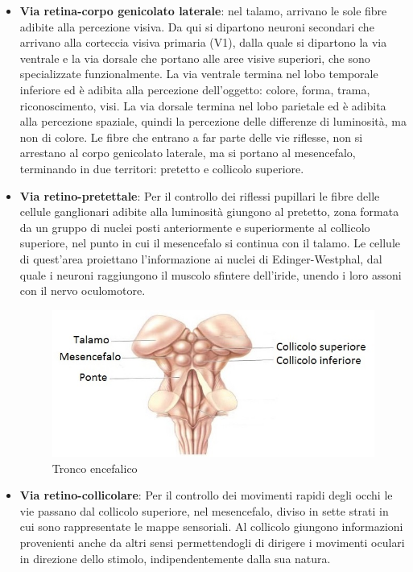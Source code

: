 \begin{itemize}
\item \textbf{Via retina-corpo genicolato laterale}: nel talamo, arrivano le sole fibre adibite alla percezione visiva. Da qui si dipartono neuroni secondari che arrivano alla corteccia visiva primaria (V1), dalla quale si dipartono la via ventrale e la via dorsale che portano alle aree visive superiori, che sono specializzate funzionalmente. La via ventrale termina nel lobo temporale inferiore ed è adibita alla percezione dell’oggetto: colore, forma, trama, riconoscimento, visi. La via dorsale termina nel lobo parietale ed è adibita alla percezione spaziale, quindi la percezione delle differenze di luminosità, ma non di colore.
Le fibre che entrano a far parte delle vie riflesse, non si arrestano al corpo genicolato laterale, ma si portano al mesencefalo, terminando in due territori: pretetto e collicolo superiore.
\item \textbf{Via retino-pretettale}: Per il controllo dei riflessi pupillari le fibre delle cellule ganglionari adibite alla luminosità giungono al pretetto, zona formata da un gruppo di nuclei posti anteriormente e superiormente al collicolo superiore, nel punto in cui il mesencefalo si continua con il talamo. Le cellule di quest’area proiettano l’informazione ai nuclei di Edinger-Westphal, dal quale i neuroni raggiungono il muscolo sfintere dell’iride, unendo i loro assoni con il nervo oculomotore.

\begin{figure}[h!]
	\centering
	\includegraphics[scale=0.52]{source/immagini/tronco_encefalico.jpg}
	\caption[Semantic Web stack]{Tronco encefalico}
	\label{fig:issuexample}
\end{figure}

\item \textbf{Via retino-collicolare}: Per il controllo dei movimenti rapidi degli occhi le vie passano dal collicolo superiore, nel mesencefalo, diviso in sette strati in cui sono rappresentate le mappe sensoriali. Al collicolo giungono informazioni provenienti anche da altri sensi permettendogli di dirigere i movimenti oculari in direzione dello stimolo, indipendentemente dalla sua natura.
\end{itemize}


